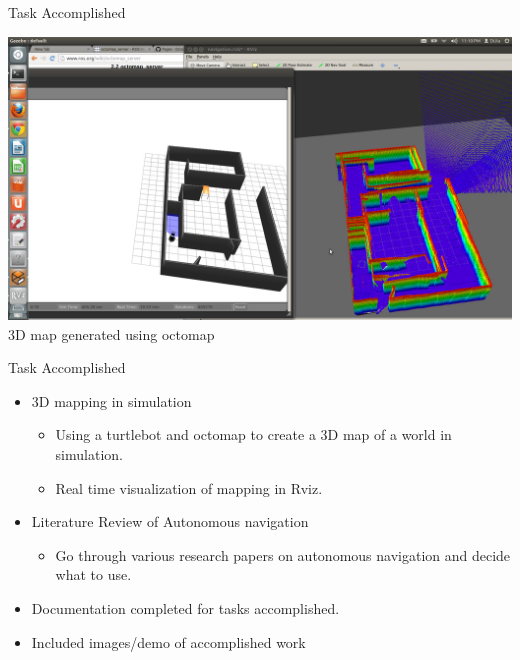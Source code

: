 \documentclass[10pt, a4paper]{beamer}
\begin{document}
\begin{frame}{Task Accomplished}
\begin{center}
\includegraphics[scale=0.18]{octomap}\\
		3D map generated using octomap
\end{center}	
\end{frame}

\begin{frame}{Task Accomplished}
	\begin{itemize}
        \item 3D mapping in simulation
        \begin{itemize}
        	\item Using a turtlebot and octomap to create a 3D map of a world in simulation.
            \item Real time visualization of mapping in Rviz.
        \end{itemize}
        \item Literature Review of Autonomous navigation
        \begin{itemize}
        	\item Go through various research papers on autonomous navigation and decide what to use.
        \end{itemize}
        \item Documentation completed for tasks accomplished.
		\item Included images/demo of accomplished work
	\end{itemize}
\end{frame}
\end{document}
